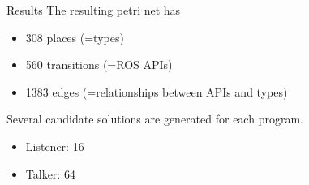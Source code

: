 \documentclass[final]{beamer}
\newlength{\onecolwid}
\begin{document}
\begin{frame}[t]
\begin{columns}[t]
\begin{column}{\onecolwid}


\begin{block}{Results}
The resulting petri net has 
\begin{itemize}
\item 308 places (=types)
\item 560 transitions (=ROS APIs)
\item 1383 edges (=relationships between APIs and types)
\end{itemize}

Several candidate solutions are generated for each program.
\begin{itemize}
\item Listener: 16
\item Talker: 64
\end{itemize}


\end{block}






\end{column}
\end{columns}
\end{frame}
\end{document}
